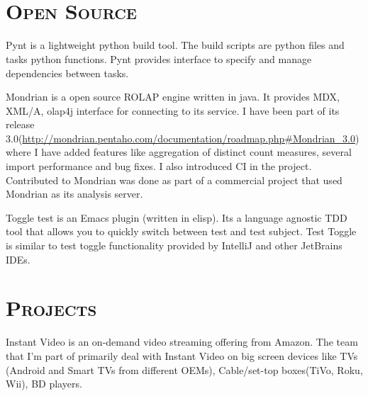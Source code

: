 \begin{resume}
\begin{formatb}
  \\
  \body\\
\end{formatb}

\section{\textsc{Open Source}}

\begin{position}
Pynt is a lightweight python build tool. The build scripts are python files and tasks python functions. Pynt provides interface to specify and manage dependencies between tasks. 
\end{position}

\begin{position}
Mondrian is a open source ROLAP engine written in java. It provides MDX, XML/A, olap4j interface for connecting to its service. I have been part of its release 3.0(\url{http://mondrian.pentaho.com/documentation/roadmap.php#Mondrian_3.0}) where I have added features like aggregation of distinct count measures, several import performance and bug fixes. I also introduced CI in the project. Contributed to Mondrian  was done as part of a commercial project that used Mondrian as its analysis server.
\end{position}

\begin{position}
Toggle test is an Emacs plugin (written in elisp). Its a language agnostic TDD tool that allows you to quickly switch between test and test subject. Test Toggle is similar to test toggle functionality provided by IntelliJ and other JetBrains IDEs.
\end{position}

\section{\textsc{Projects}}

\begin{position}
Instant Video is an on-demand video streaming offering from Amazon. The team that I'm part of primarily deal with Instant Video on big screen devices like TVs (Android and Smart TVs from different OEMs), Cable/set-top boxes(TiVo, Roku, Wii), BD players.
  

\end{position}
\end{resume}
